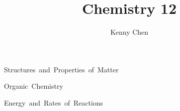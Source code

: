 \documentclass[12pt]{report}
\title{Chemistry 12}
\author{Kenny Chen}
\begin{document}
\maketitle
\tableofcontents
\newpage

\unit{Structures and Properties of Matter}










\unit{Organic Chemistry}




\unit{Energy and Rates of Reactions}

\end{document}
